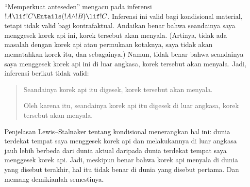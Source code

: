 \documentclass[../../../include/open-logic-section]{subfiles}
\begin{document}


``Memperkuat anteseden'' mengacu pada inferensi $!A \lif !C \Entails (!A
\land !B) \lif !C$. Inferensi ini valid bagi kondisional material, tetapi
tidak valid bagi kontrafaktual. Andaikan benar bahwa seandainya saya menggesek
korek api ini, korek tersebut akan menyala. (Artinya, tidak ada masalah dengan
korek api atau permukaan kotaknya, saya tidak akan mematahkan korek itu, dan
sebagainya.) Namun, tidak benar bahwa seandainya saya menggesek korek api ini
di luar angkasa, korek tersebut akan menyala. Jadi, inferensi berikut tidak
valid:
\begin{quote}
  Seandainya korek api itu digesek, korek tersebut akan menyala.

  Oleh karena itu, seandainya korek api itu digesek di luar angkasa, korek
  tersebut akan menyala.
\end{quote}

Penjelasan Lewis--Stalnaker tentang kondisional menerangkan hal ini: dunia
terdekat tempat saya menggesek korek api dan melakukannya di luar angkasa
jauh lebih berbeda dari dunia aktual daripada dunia terdekat tempat saya
menggesek korek api. Jadi, meskipun benar bahwa korek api menyala di dunia
yang disebut terakhir, hal itu tidak benar di dunia yang disebut pertama.
Dan memang demikianlah semestinya.
\end{document}
